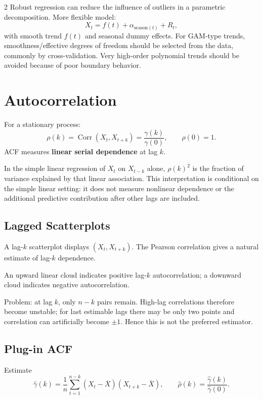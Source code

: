 \documentclass[9pt,a4paper]{extarticle}
\newcommand{\key}[1]{\textbf{#1}}
\begin{document}
\begin{multicols}{2}
Robust regression can reduce the influence of outliers in a parametric decomposition. More flexible model:
\[
X_t=f(t)+\alpha_{\text{season}(t)}+R_t,
\]
with smooth trend \(f(t)\) and seasonal dummy effects. For GAM-type trends, smoothness/effective degrees of freedom should be selected from the data, commonly by cross-validation. Very high-order polynomial trends should be avoided because of poor boundary behavior.

\section{Autocorrelation}

For a stationary process:
\[
\boxed{\rho(k)=\operatorname{Corr}(X_t,X_{t+k})=\frac{\gamma(k)}{\gamma(0)}},
\qquad \rho(0)=1.
\]
ACF measures \key{linear serial dependence} at lag \(k\).

In the simple linear regression of \(X_t\) on \(X_{t-k}\) alone, \(\rho(k)^2\) is the fraction of variance explained by that linear association. This interpretation is conditional on the simple linear setting: it does not measure nonlinear dependence or the additional predictive contribution after other lags are included.

\subsection{Lagged Scatterplots}

A lag-\(k\) scatterplot displays \((X_t,X_{t+k})\). The Pearson correlation gives a natural estimate of lag-\(k\) dependence.

An upward linear cloud indicates positive lag-\(k\) autocorrelation; a downward cloud indicates negative autocorrelation.

Problem: at lag \(k\), only \(n-k\) pairs remain. High-lag correlations therefore become unstable; for last estimable lags there may be only two points and correlation can artificially become \(\pm1\). Hence this is not the preferred estimator.

\subsection{Plug-in ACF}

Estimate
\[
\widehat\gamma(k)=\frac1n\sum_{t=1}^{n-k}(X_t-\overline X)(X_{t+k}-\overline X),
\qquad
\boxed{\widehat\rho(k)=\frac{\widehat\gamma(k)}{\widehat\gamma(0)}}.
\]


\end{multicols}
\end{document}
